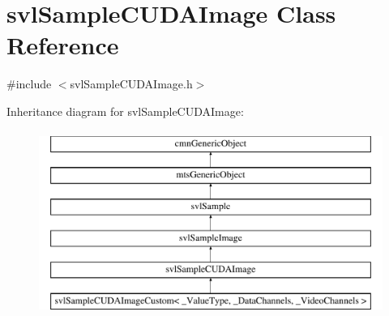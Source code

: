 \hypertarget{classsvl_sample_c_u_d_a_image}{\section{svl\-Sample\-C\-U\-D\-A\-Image Class Reference}
\label{classsvl_sample_c_u_d_a_image}
}


{\ttfamily \#include $<$svl\-Sample\-C\-U\-D\-A\-Image.\-h$>$}

Inheritance diagram for svl\-Sample\-C\-U\-D\-A\-Image\-:\begin{figure}[H]
\begin{center}
\leavevmode
\includegraphics[height=6.000000cm]{d7/db6/classsvl_sample_c_u_d_a_image}
\end{center}
\end{figure}
